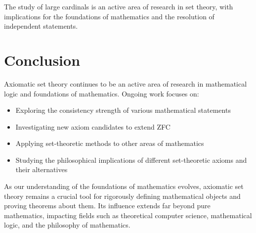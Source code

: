 \documentclass[12pt,a4paper]{article}
\newcommand{\sectiontitle}[1]{\section{\textcolor{draculaPurple}{#1}}}
\begin{document}
The study of large cardinals is an active area of research in set theory, with implications for the foundations of mathematics and the resolution of independent statements.

\sectiontitle{Conclusion}

Axiomatic set theory continues to be an active area of research in mathematical logic and foundations of mathematics. Ongoing work focuses on:

\begin{itemize}
    \item Exploring the consistency strength of various mathematical statements
    \item Investigating new axiom candidates to extend ZFC
    \item Applying set-theoretic methods to other areas of mathematics
    \item Studying the philosophical implications of different set-theoretic axioms and their alternatives
\end{itemize}

As our understanding of the foundations of mathematics evolves, axiomatic set theory remains a crucial tool for rigorously defining mathematical objects and proving theorems about them. Its influence extends far beyond pure mathematics, impacting fields such as theoretical computer science, mathematical logic, and the philosophy of mathematics.
\end{document}
